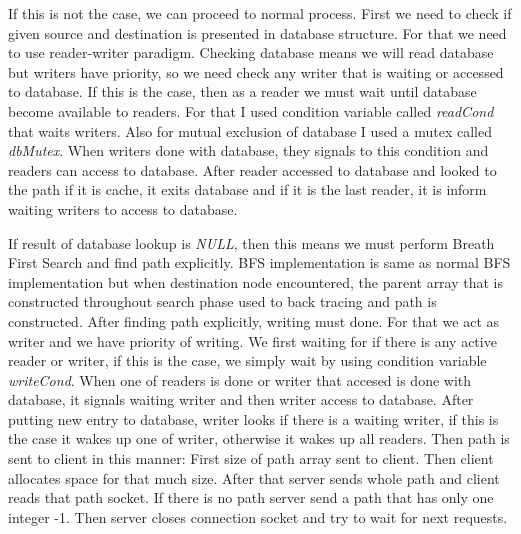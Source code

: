 \documentclass[letterpaper, 10 pt, conference]{ieeeconf}  %
\begin{document}
If this is not the case, we can proceed to normal process. First we need to check if given source and destination is presented in database structure. For that we need to use reader-writer paradigm. Checking database means we will read database but writers have priority, so we need check any writer that is waiting or accessed to database. If this is the case, then as a reader we must wait until database become available to readers. For that I used condition variable called \textit{readCond} that waits writers. Also for mutual exclusion of database I used a mutex called \textit{dbMutex}. When writers done with database, they signals to this condition and readers can access to database. After reader accessed to database and looked to the path if it is cache, it exits database and if it is the last reader, it is inform waiting writers to access to database.

If result of database lookup is \textit{NULL}, then this means we must perform Breath First Search and find path explicitly. BFS implementation is same as normal BFS implementation but when destination node encountered, the parent array that is constructed throughout search phase used to back tracing and path is constructed. After finding path explicitly, writing must done. For that we act as writer and we have priority of writing. We first waiting for if there is any active reader or writer, if this is the case, we simply wait by using condition variable \textit{writeCond}. When one of readers is done or writer that accesed is done with database, it signals waiting writer and then writer access to database. After putting new entry to database, writer looks if there is a waiting writer, if this is the case it wakes up one of writer, otherwise it wakes up all readers. Then path is sent to client in this manner: First size of path array sent to client. Then client allocates space for that much size. After that server sends whole path and client reads that path socket. If there is no path server send a path that has only one integer -1. Then server closes connection socket and try to wait for next requests. 
\end{document}
